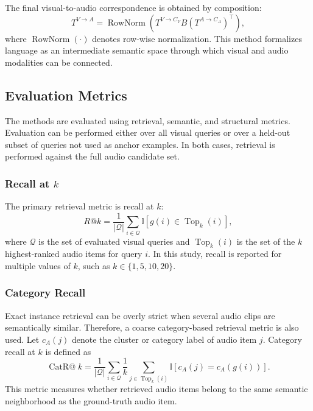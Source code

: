 The final visual-to-audio correspondence is obtained by composition:
\begin{equation}
    T^{V \rightarrow A}
    =
    \operatorname{RowNorm}
    \left(
    T^{V \rightarrow C_V}
    B
    \left(T^{A \rightarrow C_A}\right)^{\top}
    \right),
    \label{eq:transitive_bridge}
\end{equation}
where $\operatorname{RowNorm}(\cdot)$ denotes row-wise normalization. This method formalizes language as an intermediate semantic space through which visual and audio modalities can be connected.

\subsection{Evaluation Metrics}
\label{subsec:evaluation_metrics}

The methods are evaluated using retrieval, semantic, and structural metrics. Evaluation can be performed either over all visual queries or over a held-out subset of queries not used as anchor examples. In both cases, retrieval is performed against the full audio candidate set.

\subsubsection{Recall at $k$}

The primary retrieval metric is recall at $k$:
\begin{equation}
    R@k
    =
    \frac{1}{|\mathcal{Q}|}
    \sum_{i \in \mathcal{Q}}
    \mathbb{I}
    \left[
    g(i) \in \operatorname{Top}_{k}(i)
    \right],
    \label{eq:recall_at_k}
\end{equation}
where $\mathcal{Q}$ is the set of evaluated visual queries and $\operatorname{Top}_{k}(i)$ is the set of the $k$ highest-ranked audio items for query $i$. In this study, recall is reported for multiple values of $k$, such as $k \in \{1,5,10,20\}$.

\subsubsection{Category Recall}

Exact instance retrieval can be overly strict when several audio clips are semantically similar. Therefore, a coarse category-based retrieval metric is also used. Let $c_A(j)$ denote the cluster or category label of audio item $j$. Category recall at $k$ is defined as
\begin{equation}
    \operatorname{CatR@}k
    =
    \frac{1}{|\mathcal{Q}|}
    \sum_{i \in \mathcal{Q}}
    \frac{1}{k}
    \sum_{j \in \operatorname{Top}_{k}(i)}
    \mathbb{I}
    \left[
    c_A(j) = c_A(g(i))
    \right].
    \label{eq:category_recall}
\end{equation}
This metric measures whether retrieved audio items belong to the same semantic neighborhood as the ground-truth audio item.

